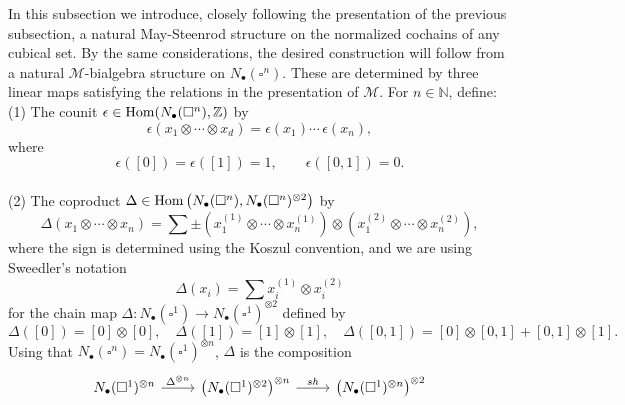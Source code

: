 In this subsection we introduce, closely following the presentation of the previous subsection, a natural May-Steenrod structure on the normalized cochains of any cubical set.
By the same considerations, the desired construction will follow from a natural $\mathcal M$-bialgebra structure on $N_\bullet(\square^n)$.
These are determined by three linear maps satisfying the relations in the presentation of $\mathcal M$.
For $n \in \mathbb{N}$, define: \vspace*{5pt} \\
(1) The counit $\epsilon \in \mathrm{Hom}(N_\bullet(\square^n), \mathbb{Z})$ by
\begin{equation*}
\epsilon \left( x_1 \otimes \cdots \otimes x_d \right) = \epsilon(x_1) \cdots \, \epsilon(x_n),
\end{equation*}
where
\begin{equation*}
\epsilon([0]) = \epsilon([1]) = 1, \qquad \epsilon([0, 1]) = 0.
\end{equation*} \vspace*{-6pt} \\
(2) The coproduct $\Delta \in \mathrm{Hom} \left( N_\bullet(\square^n), N_\bullet(\square^n)^{\otimes 2} \right)$ by
\begin{equation*}	
\Delta (x_1 \otimes \cdots \otimes x_n) = 	
\sum \pm \left( x_1^{(1)} \otimes \cdots \otimes x_n^{(1)} \right) \otimes 	
\left( x_1^{(2)} \otimes \cdots \otimes x_n^{(2)} \right),	
\end{equation*}	
where the sign is determined using the Koszul convention, and we are using Sweedler's notation
\begin{equation*}	
\Delta(x_i) = \sum x_i^{(1)} \otimes x_i^{(2)}
\end{equation*}
for the chain map $\Delta \colon N_\bullet(\square^1) \to N_\bullet(\square^1)^{\otimes 2}$ defined by
\begin{equation*}
\Delta([0]) = [0] \otimes [0], \quad \Delta([1]) = [1] \otimes [1], \quad \Delta([0, 1]) = [0] \otimes [0, 1] + [0, 1] \otimes [1].
\end{equation*}
Using that $N_\bullet(\square^n) = N_\bullet(\square^1)^{\otimes n}$, $\Delta$ is the composition
\begin{equation*}
\begin{tikzcd}
N_\bullet(\square^1)^{\otimes n} \arrow[r, "\Delta^{\otimes n}"] & \left( N_\bullet(\square^1)^{\otimes 2}  \right)^{\otimes n} \arrow[r, "sh"] & \left( N_\bullet(\square^1)^{\otimes n} \right)^{\otimes 2}
\end{tikzcd}
\end{equation*}
